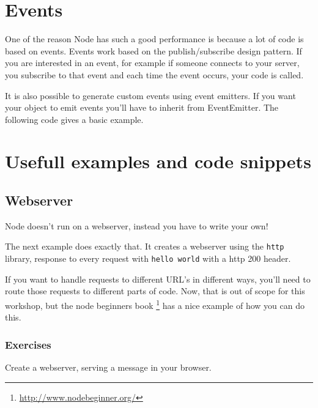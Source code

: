 \documentclass[a4paper]{report}
\begin{document}
\section*{Events} 
One of the reason Node has such a good performance is because a lot of code is based on events. Events work based on the publish/subscribe design pattern. If you are interested in an event, for example if someone connects to your server, you subscribe to that event and each time the event occurs, your code is called. 
 
 
 
\noindent It is also possible to generate custom events using event emitters. If you want your object to emit events you'll have to inherit from EventEmitter. The following code gives a basic example. 
 
 
 
\section*{Usefull examples and code snippets} 
 
\subsection*{Webserver} 
Node doesn't run on a webserver, instead you have to write your own! 
 
The next example does exactly that. It creates a webserver using the \texttt{http} library, response to every request with \texttt{hello world} with a http 200 header. 
 
 
 
\noindent If you want to handle requests to different URL's in different ways, you'll need to route those requests to different parts of code. Now, that is out of scope for this workshop, but the node beginners book \footnote{\url{http://www.nodebeginner.org/}} has a nice example of how you can do this. 
 
\subsubsection*{Exercises} 
Create a webserver, serving a message in your browser. 
 
\end{document}
